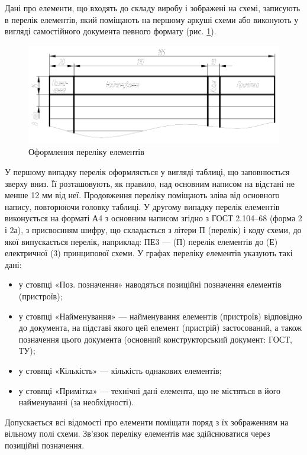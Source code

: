 Дані про елементи, що входять до складу виробу і зображені на схемі, записують в перелік елементів, який поміщають на першому аркуші схеми або виконують у вигляді самостійного документа певного формату (рис. \ref{fig:perelik}). 

\begin{figure}[h]
\centering
\includegraphics[width=\textwidth]{img/perelik-crop.pdf}
\caption{Оформлення переліку елементів}
\label{fig:perelik}
\end{figure}

У першому випадку перелік оформляється у вигляді таблиці, що заповнюється зверху вниз. Її розташовують, як правило, над основним написом на відстані не менше 12 мм від неї. Продовження переліку поміщають зліва від основного напису, повторюючи головку таблиці. У другому випадку перелік елементів виконується на
форматі А4 з основним написом згідно з ГОСТ 2.104–68 (форма 2 і 2а), з присвоєнням шифру, що складається з літери П (перелік) і коду схеми, до якої випускається перелік, наприклад: ПЕ3 — (П) перелік елементів до (Е) електричної (3) принципової схеми. У графах переліку елементів указують такі дані:

\begin{itemize}
\item у стовпці «Поз. позначення» наводяться позиційні позначення елементів (пристроїв);
\item у стовпці «Найменування» — найменування елементів (пристроїв) відповідно до документа, на підставі якого цей елемент (пристрій) застосований, а також позначення цього документа (основний конструкторський документ: ГОСТ, ТУ);
\item у стовпці «Кількість» — кількість однакових елементів;
\item у стовпці «Примітка» — технічні дані елемента, що не містяться в його найменуванні (за необхідності).
\end{itemize}

Допускається всі відомості про елементи поміщати поряд з їх зображенням на вільному полі схеми. Зв’язок переліку елементів має здійснюватися через позиційні позначення.

